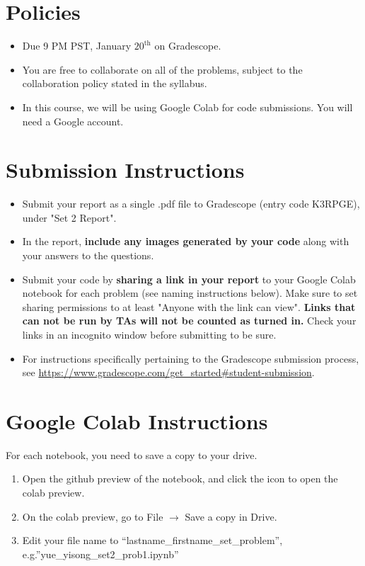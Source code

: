\documentclass{article}
\newcounter{problem}[section]
\begin{document}
\pagestyle{fancy}




\section*{Policies}
\begin{itemize}
	\item Due 9 PM PST, January $20^\text{th}$ on Gradescope. 
	\item You are free to collaborate on all of the problems, subject to the collaboration policy stated in the syllabus.
	\item In this course, we will be using Google Colab for code submissions. You will need a Google account.
\end{itemize}

\section*{Submission Instructions}
\begin{itemize}
	\item Submit your report as a single .pdf file to Gradescope (entry code K3RPGE), under "Set 2 Report". 
	\item In the report, \textbf{include any images generated by your code} along with your answers to the questions.
	\item Submit your code by \textbf{sharing a link in your report} to your Google Colab notebook for each problem (see naming instructions below). Make sure to set sharing permissions to at least "Anyone with the link can view". \textbf{Links that can not be run by TAs will not be counted as turned in.} Check your links in an incognito window before submitting to be sure. 
	\item For instructions specifically pertaining to the Gradescope submission process, see \url{https://www.gradescope.com/get_started#student-submission}.
\end{itemize}

\section*{Google Colab Instructions}
For each notebook, you need to save a copy to your drive.
\begin{enumerate}
	\item Open the github preview of the notebook, and click the icon to open the colab preview.
	\item On the colab preview, go to File $\rightarrow$ Save a copy in Drive.
	\item Edit your file name to “lastname_firstname_set_problem”, e.g.”yue_yisong_set2_prob1.ipynb”
\end{enumerate}
\end{document}
